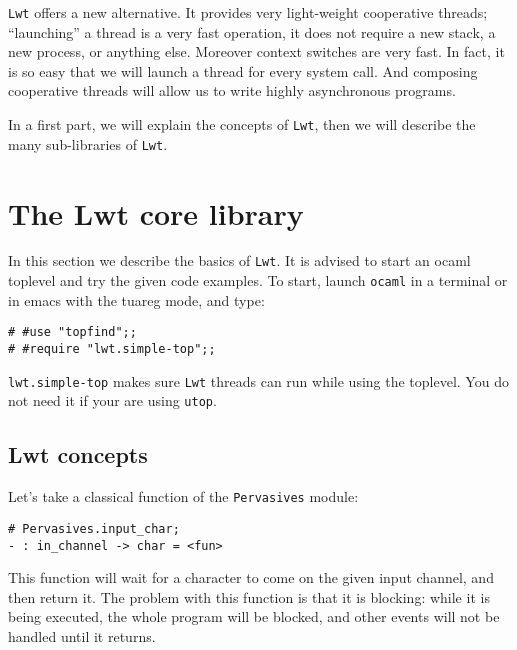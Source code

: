 {\tt Lwt} offers a new alternative. It provides very light-weight
cooperative threads; ``launching'' a thread is a very fast
operation, it does not require a new stack, a new process, or
anything else. Moreover context switches are very fast. In fact, it
is so easy that we will launch a thread for every system call. And
composing cooperative threads will allow us to write highly
asynchronous programs.



In a first part, we will explain the concepts of {\tt Lwt}, then we will
describe the many sub-libraries of {\tt Lwt}.



\section{ The Lwt core library }

In this section we describe the basics of {\tt Lwt}. It is advised to
start an ocaml toplevel and try the given code examples. To start,
launch {\tt ocaml} in a terminal or in emacs with the tuareg
mode, and type:



\begin{verbatim}
# #use "topfind";;
# #require "lwt.simple-top";;
\end{verbatim}
\medskip

\noindent
{\tt lwt.simple-top} makes sure {\tt Lwt} threads can run while
using the toplevel. You do not need it if your are using {\tt utop}.



\subsection{ Lwt concepts }

Let's take a classical function of the {\tt Pervasives} module:



\lstset{language=[Objective]Caml}\begin{lstlisting}
# Pervasives.input_char;
- : in_channel -> char = <fun>
\end{lstlisting}
\medskip

\noindent
This function will wait for a character to come on the given input
channel, and then return it. The problem with this function is that it is
blocking: while it is being executed, the whole program will be
blocked, and other events will not be handled until it returns.




